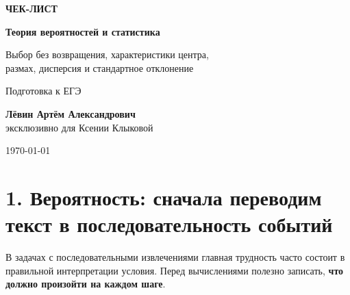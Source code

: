 \documentclass[a4paper,12pt]{article}
\newcommand{\key}[1]{\textcolor{darkaccent}{\textbf{#1}}}
\begin{document}

\begin{titlepage}
\thispagestyle{empty}

\begin{center}
\vspace*{24mm}

{\Large\textcolor{darkaccent}{\textbf{ЧЕК-ЛИСТ}}}

\vspace{9mm}

{\huge\textbf{Теория вероятностей и статистика}}

\vspace{8mm}

{\Large
Выбор без возвращения, характеристики центра,\\[2mm]
размах, дисперсия и стандартное отклонение
}

\vspace{12mm}

{\large Подготовка к ЕГЭ}

\vfill

{\large
\textbf{Лёвин Артём Александрович}\\[2mm]
эксклюзивно для Ксении Клыковой
}

\vspace{8mm}

{\large \today}

\vfill


\end{center}
\end{titlepage}

\section*{1. Вероятность: сначала переводим текст в последовательность событий}

В задачах с последовательными извлечениями главная трудность часто состоит в правильной интерпретации условия. Перед вычислениями полезно записать, \key{что должно произойти на каждом шаге}.
\end{document}
